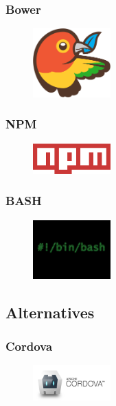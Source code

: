 \begin{figure}
\subsubsection{Bower}
\begin{figure}
\includegraphics[width=3cm]{img/mobile-app/logos/bower.png}
\end{figure} 


\subsubsection{NPM}
\begin{figure}
\includegraphics[width=3cm]{img/mobile-app/logos/npm.png}
\end{figure} 


\subsubsection{BASH}
\begin{figure}
\includegraphics[width=3cm]{img/mobile-app/logos/bash.jpg}
\end{figure} 

\subsection{Alternatives}
\subsubsection{Cordova}
\begin{figure}
\includegraphics[width=3cm]{img/mobile-app/logos/cordova.jpg}
\end{figure} 


\end{figure}
